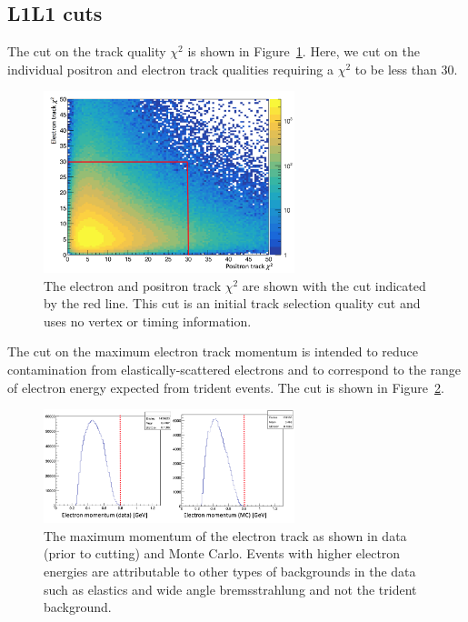 \subsection{L1L1 cuts}

The cut on the track quality $\chi^2$ is shown in Figure~\ref{fig:trkChi2}. Here, we cut on the individual positron and electron track qualities requiring a $\chi^2$ to be less than 30. 
\begin{figure}[H]
  \centering
      \includegraphics[width=0.65\textwidth]{pics/searching/trkChi2.png}
  \caption[Track $\chi^2$ cut]{The electron and positron track $\chi^2$ are shown with the cut indicated by the red line. This cut is an initial track selection quality cut and uses no vertex or timing information.}
  \label{fig:trkChi2}
\end{figure} 
The cut on the maximum electron track momentum is intended to reduce contamination from elastically-scattered electrons and to correspond to the range of electron energy expected from trident events.  The cut is shown in Figure~\ref{fig:emTrkPmax}.
\begin{figure}[H]
  \centering
      \includegraphics[width=0.65\textwidth]{pics/searching/emTrkPmax.png}
  \caption[Maximum $e^-$ track momentum]{The maximum momentum of the electron track as shown in data (prior to cutting) and Monte Carlo. Events with higher electron energies are attributable to other types of backgrounds in the data such as elastics and wide angle bremsstrahlung and not the trident background.}
  \label{fig:emTrkPmax}
\end{figure} 
